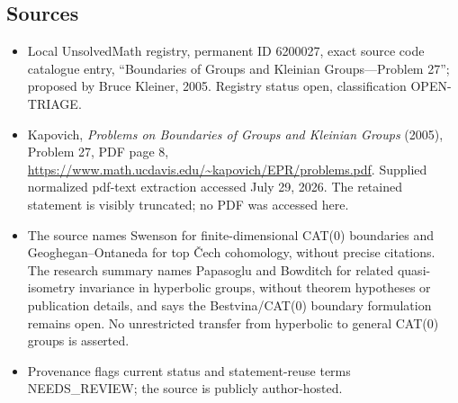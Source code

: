 \documentclass[11pt]{article}
\begin{document}
\subsection{Sources}
\begin{itemize}
\item Local UnsolvedMath registry, permanent ID 6200027, exact source code catalogue entry, ``Boundaries of Groups and Kleinian Groups---Problem 27''; proposed by Bruce Kleiner, 2005. Registry status open, classification OPEN-TRIAGE.
\item Kapovich, \emph{Problems on Boundaries of Groups and Kleinian Groups} (2005), Problem 27, PDF page 8, \url{https://www.math.ucdavis.edu/~kapovich/EPR/problems.pdf}. Supplied normalized pdf-text extraction accessed July 29, 2026. The retained statement is visibly truncated; no PDF was accessed here.
\item The source names Swenson for finite-dimensional CAT(0) boundaries and Geoghegan--Ontaneda for top \v{C}ech cohomology, without precise citations. The research summary names Papasoglu and Bowditch for related quasi-isometry invariance in hyperbolic groups, without theorem hypotheses or publication details, and says the Bestvina/CAT(0) boundary formulation remains open. No unrestricted transfer from hyperbolic to general CAT(0) groups is asserted.
\item Provenance flags current status and statement-reuse terms NEEDS\_REVIEW; the source is publicly author-hosted.
\end{itemize}
\end{document}
